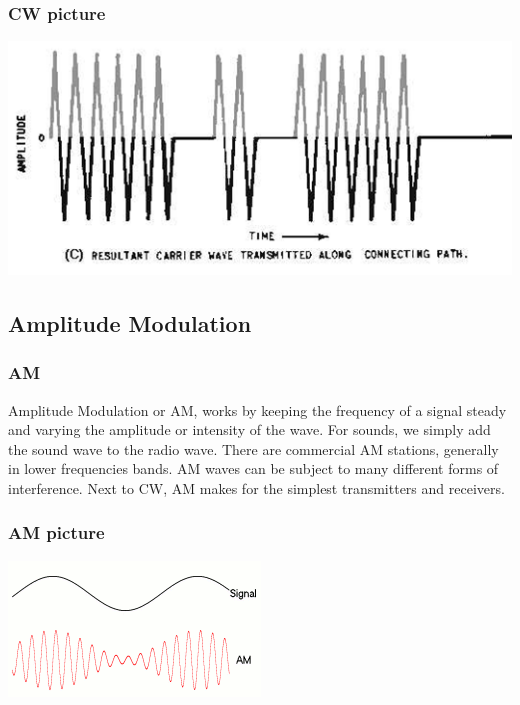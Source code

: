 \documentclass[10pt]{beamer}
\begin{document}
\begin{frame}
\frametitle{CW picture}
\includegraphics[height=.5\textheight]{cw.png}
\end{frame}

\subsection{Amplitude Modulation}

\begin{frame}
\frametitle{AM}
Amplitude Modulation or AM, works by keeping the frequency of a signal steady and varying the amplitude or intensity of the wave. For sounds, we simply add the sound wave to the radio wave. There are commercial AM stations, generally in lower frequencies bands. AM waves can be subject to many different forms of interference. Next to CW, AM makes for the simplest transmitters and receivers.
\end{frame}

\begin{frame}
\frametitle{AM picture}
\includegraphics[height=.5\textheight]{am.png}
\end{frame}
\end{document}
